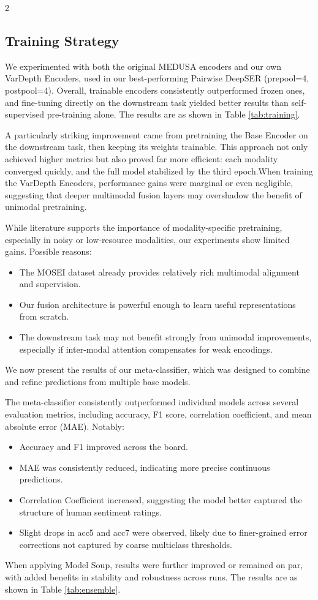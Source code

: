 \documentclass[10pt]{article}
\begin{document}
\begin{multicols}{2}
\subsection{Training Strategy}
\par We experimented with both the original MEDUSA encoders and our own VarDepth Encoders, used in our best-performing Pairwise DeepSER (prepool=4, postpool=4). Overall, trainable encoders consistently outperformed frozen ones, and fine-tuning directly on the downstream task yielded better results than self-supervised pre-training alone. The results are as shown in Table \ref{tab:training}. 
\par Α particularly striking improvement came from pretraining the Base Encoder on the downstream task, then keeping its weights trainable. This approach not only achieved higher metrics but also proved far more efficient: each modality converged quickly, and the full model stabilized by the third epoch.When training the VarDepth Encoders,  performance gains were marginal or even negligible, suggesting that deeper multimodal fusion layers may overshadow the benefit of unimodal pretraining.
\par While literature supports the importance of modality-specific pretraining, especially in noisy or low-resource modalities, our experiments show limited gains. Possible reasons:
\begin{itemize}
    \item The MOSEI dataset already provides relatively rich multimodal alignment and supervision.
    \item Our fusion architecture is powerful enough to learn useful representations from scratch.
    \item The downstream task may not benefit strongly from unimodal improvements, especially if inter-modal attention compensates for weak encodings.
\end{itemize}
\par We now present the results of our meta-classifier, which was designed to combine and refine predictions from multiple base models.
\par The meta-classifier consistently outperformed individual models across several evaluation metrics, including accuracy, F1 score, correlation coefficient, and mean absolute error (MAE). Notably:
\begin{itemize}
    \item Accuracy and F1 improved across the board.
    \item MAE was consistently reduced, indicating more precise continuous predictions.
    \item Correlation Coefficient increased, suggesting the model better captured the structure of human sentiment ratings.
    \item Slight drops in acc5 and acc7 were observed, likely due to finer-grained error corrections not captured by coarse multiclass thresholds.
\end{itemize}
\par When applying Model Soup, results were further improved or remained on par, with added benefits in stability and robustness across runs. The results are as shown in Table \ref{tab:ensemble}.



\end{multicols}
\end{document}
